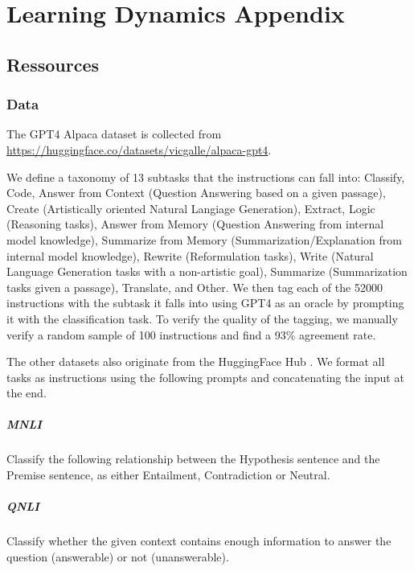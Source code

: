\chapter{Learning Dynamics Appendix}
\section{Ressources}

\subsection{Data}
The GPT4 Alpaca dataset is collected from \url{https://huggingface.co/datasets/vicgalle/alpaca-gpt4}. 

\label{sec:alpaca-pres}
We define a taxonomy of 13 subtasks that the instructions can fall into: Classify, Code, Answer from Context (Question Answering based on a given passage), Create (Artistically oriented Natural Langiage Generation), Extract, Logic (Reasoning tasks), Answer from Memory (Question Answering from internal model knowledge), Summarize from Memory (Summarization/Explanation from internal model knowledge), Rewrite (Reformulation tasks), Write (Natural Language Generation tasks with a non-artistic goal), Summarize (Summarization tasks given a passage), Translate, and Other.
We then tag each of the 52000 instructions with the subtask it falls into using GPT4 as an oracle by prompting it with the classification task.
To verify the quality of the tagging, we manually verify a random sample of 100 instructions and find a 93\% agreement rate. 

The other datasets also originate from the HuggingFace Hub . We format all tasks as instructions using the following prompts and concatenating the input at the end.

\paragraph{MNLI}  Classify the following relationship between the Hypothesis sentence and the Premise sentence, as either Entailment, Contradiction or Neutral. 

\paragraph{QNLI}  Classify whether the given context contains enough information to answer the question (answerable) or not (unanswerable).


